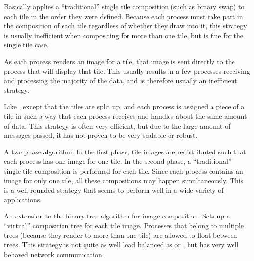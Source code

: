 
  \begin{Description}
  \item[\CEnum{ICET\_STRATEGY\_SEQUENTIAL}]
    Basically applies a ``traditional'' single tile composition (such as
    binary swap) to each tile in the order they were defined.  Because each
    process must take part in the composition of each tile regardless of
    whether they draw into it, this strategy is usually inefficient
    when compositing for more than one tile, but is fine for the single
    tile case.
  \item[\CEnum{ICET\_STRATEGY\_DIRECT}] As each process renders an image
    for a tile, that image is sent directly to the process that will
    display that tile.  This usually results in a few processes receiving
    and processing the majority of the data, and is therefore usually an
    inefficient strategy.
  \item[\CEnum{ICET\_STRATEGY\_SPLIT}] Like ,
    except that the tiles are split up, and each process is assigned a
    piece of a tile in such a way that each process receives and handles
    about the same amount of data.  This strategy is often very efficient,
    but due to the large amount of messages passed, it has not proven to be
    very scalable or robust.
  \item[\CEnum{ICET\_STRATEGY\_REDUCE}] A two phase algorithm.  In the
    first phase, tile images are redistributed such that each process has
    one image for one tile.  In the second phase, a ``traditional'' single
    tile composition is performed for each tile.  Since each process
    contains an image for only one tile, all these compositions may happen
    simultaneously.  This is a well rounded strategy that seems to perform
    well in a wide variety of applications.
  \item[\CEnum{ICET\_STRATEGY\_VTREE}] An extension to the binary tree
    algorithm for image composition.  Sets up a ``virtual'' composition
    tree for each tile image.  Processes that belong to multiple trees
    (because they render to more than one tile) are allowed to float
    between trees.  This strategy is not quite as well load balanced as
     or , but
    has very well behaved network communication.
  \end{Description}
